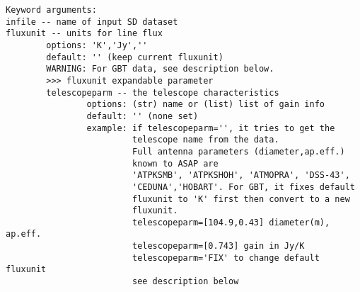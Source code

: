\begin{verbatim}
Keyword arguments:
infile -- name of input SD dataset
fluxunit -- units for line flux
        options: 'K','Jy',''
        default: '' (keep current fluxunit)
        WARNING: For GBT data, see description below.
        >>> fluxunit expandable parameter
        telescopeparm -- the telescope characteristics
                options: (str) name or (list) list of gain info
                default: '' (none set)
                example: if telescopeparm='', it tries to get the 
                         telescope name from the data.
                         Full antenna parameters (diameter,ap.eff.) 
                         known to ASAP are
                         'ATPKSMB', 'ATPKSHOH', 'ATMOPRA', 'DSS-43',
                         'CEDUNA','HOBART'. For GBT, it fixes default 
                         fluxunit to 'K' first then convert to a new 
                         fluxunit.
                         telescopeparm=[104.9,0.43] diameter(m), ap.eff.
                         telescopeparm=[0.743] gain in Jy/K
                         telescopeparm='FIX' to change default fluxunit
                         see description below


\end{verbatim}
